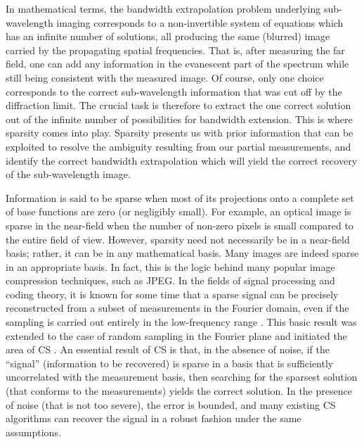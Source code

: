 In mathematical terms, the bandwidth extrapolation problem underlying
sub-wavelength imaging corresponds to a non-invertible system of
equations which has an infinite number of solutions, all producing the
same (blurred) image carried by the propagating spatial
frequencies. That is, after measuring the far field, one can add any
information in the evanescent part of the spectrum while still being
consistent with the measured image. Of course, only one choice
corresponds to the correct sub-wavelength information that was cut off
by the diffraction limit. The crucial task is therefore to extract the
one correct solution out of the infinite number of possibilities for
bandwidth extension. This is where sparsity comes into play. Sparsity
presents us with prior information that can be exploited to resolve
the ambiguity resulting from our partial measurements, and identify
the correct bandwidth extrapolation which will yield the correct
recovery of the sub-wavelength image.

Information is said to be sparse when most of its projections onto a
complete set of base functions are zero (or negligibly small). For
example, an optical image is sparse in the near-field when the number
of non-zero pixels is small compared to the entire field of
view. However, sparsity need not necessarily be in a near-field basis;
rather, it can be in any mathematical basis. Many images are indeed
sparse in an appropriate basis. In fact, this is the logic behind many
popular image compression techniques, such as JPEG. In the fields of
signal processing and coding theory, it is known for some time that a
sparse signal can be precisely reconstructed from a subset of
measurements in the Fourier domain, even if the sampling is carried
out entirely in the low-frequency range
. This basic result was extended to the case
of random sampling in the Fourier plane and initiated the area of CS
. An essential result of CS is that, in the
absence of noise, if the ``signal'' (information to be recovered) is
sparse in a basis that is sufficiently uncorrelated with the
measurement basis, then searching for the sparsest solution (that
conforms to the measurements) yields the correct solution. In the
presence of noise (that is not too severe), the error is bounded, and
many existing CS algorithms can recover the signal in a robust fashion
under the same assumptions.

